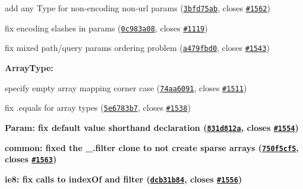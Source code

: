 {{{\begin{DoxyItemize}
{\begin{DoxyItemize}
\item add \textquotesingle{}any\textquotesingle{} Type for non-\/encoding non-\/url params (\href{https://github.com/angular-ui/ui-router/commit/3bfd75ab445ee2f1dd55275465059ed116b10b27}{\tt 3bfd75ab}, closes \href{https://github.com/angular-ui/ui-router/issues/1562}{\tt \#1562})
\item fix encoding slashes in params (\href{https://github.com/angular-ui/ui-router/commit/0c983a08e2947f999683571477debd73038e95cf}{\tt 0c983a08}, closes \href{https://github.com/angular-ui/ui-router/issues/1119}{\tt \#1119})
\item fix mixed path/query params ordering problem (\href{https://github.com/angular-ui/ui-router/commit/a479fbd0b8eb393a94320973e5b9a62d83912ee2}{\tt a479fbd0}, closes \href{https://github.com/angular-ui/ui-router/issues/1543}{\tt \#1543})
\end{DoxyItemize}}
\item {\bfseries {\bfseries Array\+Type\+:}
\begin{DoxyItemize}
\item specify empty array mapping corner case (\href{https://github.com/angular-ui/ui-router/commit/74aa60917e996b0b4e27bbb4eb88c3c03832021d}{\tt 74aa6091}, closes \href{https://github.com/angular-ui/ui-router/issues/1511}{\tt \#1511})
\item fix .equals for array types (\href{https://github.com/angular-ui/ui-router/commit/5e6783b77af9a90ddff154f990b43dbb17eeda6e}{\tt 5e6783b7}, closes \href{https://github.com/angular-ui/ui-router/issues/1538}{\tt \#1538})
\end{DoxyItemize}}
\item {\bfseries {\bfseries Param\+:} fix default value shorthand declaration (\href{https://github.com/angular-ui/ui-router/commit/831d812a524524c71f0ee1c9afaf0487a5a66230}{\tt 831d812a}, closes \href{https://github.com/angular-ui/ui-router/issues/1554}{\tt \#1554})}
\item {\bfseries {\bfseries common\+:} fixed the \+\_\+.\+filter clone to not create sparse arrays (\href{https://github.com/angular-ui/ui-router/commit/750f5cf5fd91f9ada96f39e50d39aceb2caf22b6}{\tt 750f5cf5}, closes \href{https://github.com/angular-ui/ui-router/issues/1563}{\tt \#1563})}
\item {\bfseries {\bfseries ie8\+:} fix calls to index\+Of and filter (\href{https://github.com/angular-ui/ui-router/commit/dcb31b843391b3e61dee4de13f368c109541813e}{\tt dcb31b84}, closes \href{https://github.com/angular-ui/ui-router/issues/1556}{\tt \#1556})}
\end{DoxyItemize}}}}

